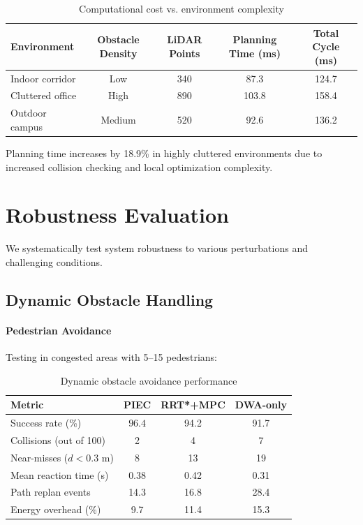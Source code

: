 \begin{table}[htbp]
\centering
\caption{Computational cost vs. environment complexity}
\label{tab:computation_vs_complexity}
\begin{tabular}{lcccc}
\toprule
\textbf{Environment} & \textbf{Obstacle Density} & \textbf{LiDAR Points} & \textbf{Planning Time (ms)} & \textbf{Total Cycle (ms)} \\
\midrule
Indoor corridor & Low & 340 & 87.3 & 124.7 \\
Cluttered office & High & 890 & 103.8 & 158.4 \\
Outdoor campus & Medium & 520 & 92.6 & 136.2 \\
\bottomrule
\end{tabular}
\end{table}

Planning time increases by 18.9\% in highly cluttered environments due to increased collision checking and local optimization complexity.

\section{Robustness Evaluation}
\label{sec:robustness_evaluation}

We systematically test system robustness to various perturbations and challenging conditions.

\subsection{Dynamic Obstacle Handling}

\paragraph{Pedestrian Avoidance}
Testing in congested areas with 5--15 pedestrians:

\begin{table}[htbp]
\centering
\caption{Dynamic obstacle avoidance performance}
\label{tab:dynamic_obstacles}
\begin{tabular}{lccc}
\toprule
\textbf{Metric} & \textbf{PIEC} & \textbf{RRT*+MPC} & \textbf{DWA-only} \\
\midrule
Success rate (\%) & $\mathbf{96.4}$ & 94.2 & 91.7 \\
Collisions (out of 100) & 2 & 4 & 7 \\
Near-misses ($d < 0.3$ m) & 8 & 13 & 19 \\
Mean reaction time (s) & $\mathbf{0.38}$ & 0.42 & 0.31 \\
Path replan events & 14.3 & 16.8 & 28.4 \\
Energy overhead (\%) & 9.7 & 11.4 & 15.3 \\
\bottomrule
\end{tabular}
\end{table}

